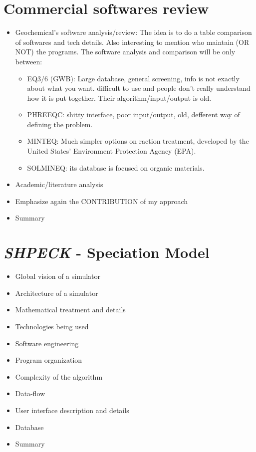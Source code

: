 \documentclass[ppgc,mestrado,english]{iiufrgs}
\begin{document}
\chapter{Commercial softwares review}
\label{chapter:review}

\begin{itemize}
\item Geochemical's software analysis/review: The idea is to do a table comparison of softwares and tech details. Also interesting to mention who maintain (OR NOT) the programs. The software analysis and comparison will be only between:
\begin{itemize}
\item EQ3/6 (GWB): Large database, general screening, info is not exactly about what you want. difficult to use and people don't really understand how it is put together. Their algorithm/input/output is old. 
\item PHREEQC: shitty interface, poor input/output, old, defferent way of defining the problem.
\item MINTEQ: Much simpler options on raction treatment, developed by the United States' Environment Protection Agency (EPA). 
\item SOLMINEQ: its database is focused on organic materials.
\end{itemize}
\item Academic/literature analysis
\item Emphasize again the CONTRIBUTION of my approach
\item Summary
\end{itemize}


\chapter{\emph{SHPECK} - Speciation Model}
\label{chapter:SHPECK}
\begin{itemize}
\item	Global vision of a simulator
\item	Architecture of a simulator
\item	Mathematical treatment and details
\item	Technologies being used
\item	Software engineering
\item	Program organization
\item	Complexity of the algorithm
\item	Data-flow
\item	User interface description and details
\item	Database
\item	Summary
\end{itemize}
\end{document}
